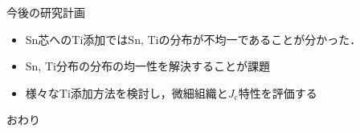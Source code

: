 \documentclass[aspectratio=169, unicode, 10pt]{beamer}
\begin{document}
	\begin{frame}{今後の研究計画}
		\begin{itemize}
			\item Sn芯へのTi添加ではSn, Tiの分布が不均一であることが分かった．
			\item Sn, Ti分布の分布の均一性を解決することが課題
			\item 様々なTi添加方法を検討し，微細組織と$J_\mathrm{c}$特性を評価する
		\end{itemize}
		
	\end{frame}
	\begin{frame}{}
		\centering
		{\LARGE おわり}
	\end{frame}
\end{document}
